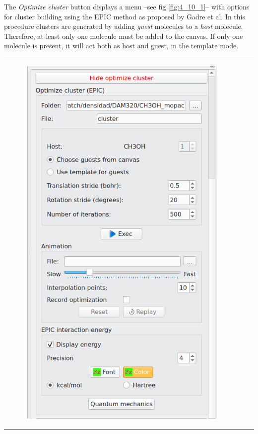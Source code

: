 \documentclass[10pt]{article}
\begin{document}
The {\it Optimize cluster} button displays a menu 
--see fig \ref{fig:4_10_1}-- with options for 
cluster building using the EPIC method as proposed by Gadre et al.\footnotemark
{}
In this procedure clusters are generated by adding {\it guest} molecules to 
a {\it host} molecule. Therefore, at least only one molecule must be
added to the canvas. If only one molecule is present, it will act both as host
and guest, in the template mode.

\vspace*{5mm}

\begin{tabular}{lcr}
\begin{minipage}{.3\linewidth}
    \begin{figure}[H]
        \begin{center}
            \includegraphics[width=0.75\linewidth]{damqt320_mespimizer_1.png}

\end{center}
\end{figure}
\end{minipage}
\end{tabular}
\end{document}
